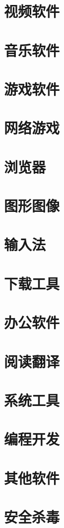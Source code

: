 \section{视频软件}
\section{音乐软件}
\section{游戏软件}
\section{网络游戏}
\section{浏览器}
\section{图形图像}
\section{输入法}
\section{下载工具}
\section{办公软件}
\section{阅读翻译}
\section{系统工具}
\section{编程开发}
\section{其他软件}
\section{安全杀毒}















